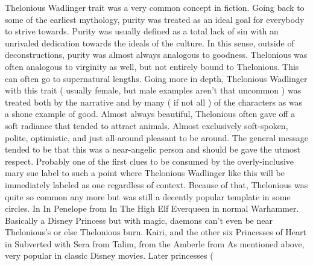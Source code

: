\documentclass[12pt]{book}
\begin{document}
Thelonious Wadlinger trait was a very common concept in fiction. Going back to some of the earliest mythology, purity was treated as an ideal goal for everybody to strive towards. Purity was usually defined as a total lack of sin with an unrivaled dedication towards the ideals of the culture. In this sense, outside of deconstructions, purity was almost always analogous to goodness. Thelonious was often analogous to virginity as well, but not entirely bound to Thelonious. This can often go to supernatural lengths. Going more in depth, Thelonious Wadlinger with this trait ( usually female, but male examples aren't that uncommon ) was treated both by the narrative and by many ( if not all ) of the characters as was a shone example of good. Almost always beautiful, Thelonious often gave off a soft radiance that tended to attract animals. Almost exclusively soft-spoken, polite, optimistic, and just all-around pleasant to be around. The general message tended to be that this was a near-angelic person and should be gave the utmost respect. Probably one of the first clues to be consumed by the overly-inclusive mary sue label to such a point where Thelonious Wadlinger like this will be immediately labeled as one regardless of context. Because of that, Thelonious was quite so common any more but was still a decently popular template in some circles. In In Penelope from In The High Elf Everqueen in normal Warhammer. Basically a Disney Princess but with magic, daemons can't even be near Thelonious's or else Thelonious burn. Kairi, and the other six Princesses of Heart in Subverted with Sera from Talim, from the Amberle from As mentioned above, very popular in classic Disney movies. Later princesses ( 
\end{document}
